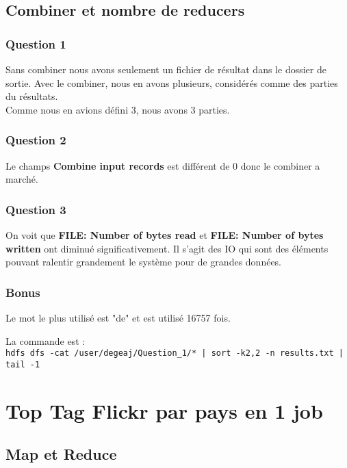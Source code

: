 \documentclass[a4paper,11pt]{article}
\begin{document}
\subsection{Combiner et nombre de reducers}

\subsubsection{Question 1}

Sans combiner nous avons seulement un fichier de résultat dans le dossier de sortie. Avec le combiner, nous en avons plusieurs, considérés comme des parties du résultats. \\
Comme nous en avions défini 3, nous avons 3 parties. 

\subsubsection{Question 2}

Le champs \textbf{Combine input records} est différent de 0 donc le combiner a marché. 

\subsubsection{Question 3}

On voit que \textbf{FILE: Number of bytes read} et \textbf{FILE: Number of bytes written} ont diminué significativement. Il s'agit des IO qui sont des éléments pouvant ralentir grandement le système pour de grandes données. 

\subsubsection{Bonus}

Le mot le plus utilisé est "de" et est utilisé 16757 fois. 

La commande est : \\
\verb$hdfs dfs -cat /user/degeaj/Question_1/* | sort -k2,2 -n results.txt | tail -1$


\section{Top Tag Flickr par pays en 1 job}

\subsection{Map et Reduce}
\end{document}
